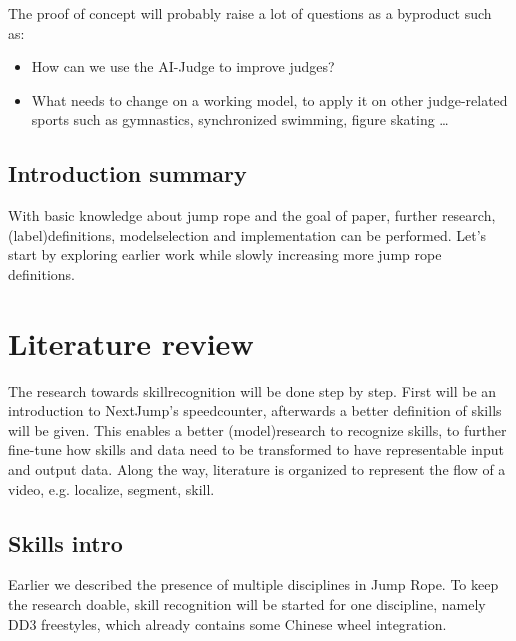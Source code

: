 The proof of concept will probably raise a lot of questions as a byproduct such as:

\begin{itemize}
    \item How can we use the AI-Judge to improve judges?
    \item What needs to change on a working model, to apply it on other judge-related sports such as gymnastics, synchronized swimming, figure skating \dots
\end{itemize}


\subsection{Introduction summary}
\label{subsubsec:intro-summary}

With basic knowledge about jump rope and the goal of paper, further research, (label)definitions, modelselection and implementation can be performed. Let's start by exploring earlier work while slowly increasing more jump rope definitions.




\section{Literature review}%
\label{sec:literature}


The research towards skillrecognition will be done step by step. First will be an introduction to NextJump's speedcounter, afterwards a better definition of skills will be given. This enables a better (model)research to recognize skills, to further fine-tune how skills and data need to be transformed to have representable input and output data. Along the way, literature is organized to represent the flow of a video, e.g. localize, segment, skill.

\subsection{Skills intro}
\label{subsec:literature-basisskills}

Earlier we described the presence of multiple disciplines in Jump Rope. To keep the research doable, skill recognition will be started for one discipline, namely DD3 freestyles, which already contains some Chinese wheel integration.

